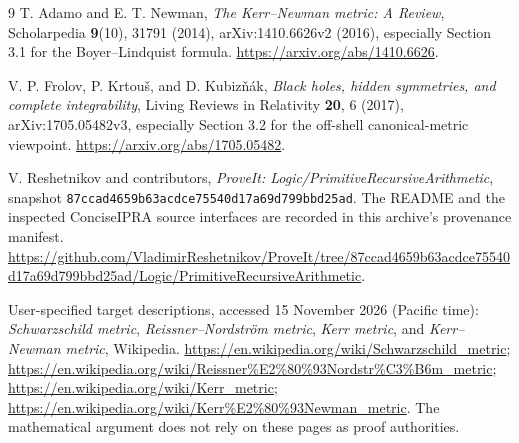 \documentclass[11pt,a4paper]{article}
\numberwithin{equation}{section}
\theoremstyle{definition}\newtheorem{definition}[theorem]{Definition}
\theoremstyle{remark}\newtheorem{remark}[theorem]{Remark}
\begin{document}
{\raggedright\begin{thebibliography}{9}
T. Adamo and E. T. Newman,
\emph{The Kerr--Newman metric: A Review}, Scholarpedia \textbf{9}(10), 31791 (2014),
arXiv:1410.6626v2 (2016), especially Section 3.1 for the Boyer--Lindquist formula.
\url{https://arxiv.org/abs/1410.6626}.

V. P. Frolov, P. Krtou\v{s}, and D. Kubiz\v{n}\'ak,
\emph{Black holes, hidden symmetries, and complete integrability},
Living Reviews in Relativity \textbf{20}, 6 (2017), arXiv:1705.05482v3,
especially Section 3.2 for the off-shell canonical-metric viewpoint.
\url{https://arxiv.org/abs/1705.05482}.

V. Reshetnikov and contributors,
\emph{ProveIt: Logic/PrimitiveRecursiveArithmetic}, snapshot
\texttt{87ccad4659b63acdce75540d17a69d799bbd25ad}.
The README and the inspected ConciseIPRA source interfaces are recorded in this archive's provenance manifest.
\url{https://github.com/VladimirReshetnikov/ProveIt/tree/87ccad4659b63acdce75540d17a69d799bbd25ad/Logic/PrimitiveRecursiveArithmetic}.

User-specified target descriptions, accessed 15 November 2026 (Pacific time):
\emph{Schwarzschild metric}, \emph{Reissner--Nordstr\"om metric}, \emph{Kerr metric}, and \emph{Kerr--Newman metric}, Wikipedia.
\url{https://en.wikipedia.org/wiki/Schwarzschild_metric};
\url{https://en.wikipedia.org/wiki/Reissner%E2%80%93Nordstr%C3%B6m_metric};
\url{https://en.wikipedia.org/wiki/Kerr_metric};
\url{https://en.wikipedia.org/wiki/Kerr%E2%80%93Newman_metric}.
The mathematical argument does not rely on these pages as proof authorities.
\end{thebibliography}}
\end{document}
